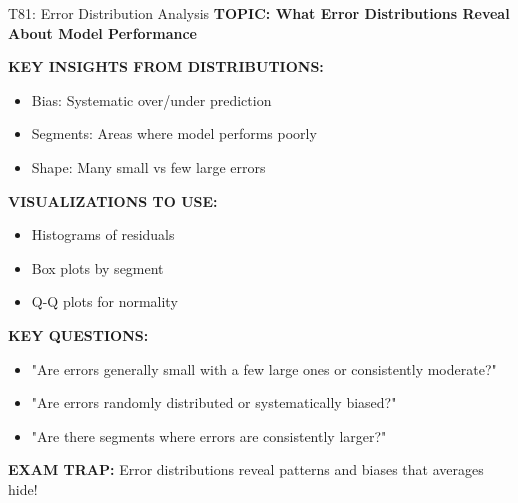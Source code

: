 \documentclass[8pt]{beamer}
\begin{document}
	\begin{frame}{T81: Error Distribution Analysis}
		\fontsize{6.5}{7.5}\selectfont
		\textbf{TOPIC: What Error Distributions Reveal About Model Performance}
		
		\vspace{0.1cm}
		\textbf{KEY INSIGHTS FROM DISTRIBUTIONS:}
		\begin{itemize}
			\item \textcolor{myblue}{Bias:} Systematic over/under prediction
			\item \textcolor{myblue}{Segments:} Areas where model performs poorly
			\item \textcolor{myblue}{Shape:} Many small vs few large errors
		\end{itemize}
		
		\vspace{0.1cm}
		\textbf{VISUALIZATIONS TO USE:}
		\begin{itemize}
			\item Histograms of residuals
			\item Box plots by segment
			\item Q-Q plots for normality
		\end{itemize}
		
		\vspace{0.1cm}
		\textbf{KEY QUESTIONS:}
		\begin{itemize}
			\item "Are errors generally small with a few large ones or consistently moderate?"
			\item "Are errors randomly distributed or systematically biased?"
			\item "Are there segments where errors are consistently larger?"
		\end{itemize}
		
		\textcolor{myred}{\textbf{EXAM TRAP:}} Error distributions reveal \textcolor{myblue}{patterns and biases} that averages hide!
	\end{frame}
	
\end{document}
